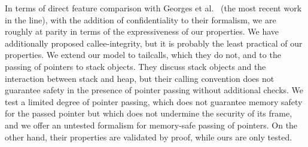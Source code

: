 \documentclass[10pt,conference]{ieeetran}%
\theoremstyle{definition}
\begin{document}

In terms of direct feature comparison with Georges et al.~\cite{Georges22:TempsDesCerises} (the most
recent work in the line), with the addition of confidentiality to their formalism, we
are roughly at parity in terms of the expressiveness of our properties.
We have additionally proposed callee-integrity, but it is probably the least
practical of our properties. We extend our model to tailcalls, which they do
not, and to the passing of pointers to stack objects. They discuss stack objects
and the interaction between stack and heap, but their calling convention does not
guarantee safety in the presence of pointer passing without additional checks.
We test a limited degree of pointer passing, which does not guarantee memory
safety for the passed pointer but which does not undermine the security of its
frame, and we offer an untested formalism for memory-safe passing of pointers.
On the other hand, their properties are validated by proof, while ours are
only tested.

%
\end{document}
